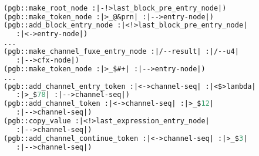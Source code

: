 \begin{lstlisting}[language = lisp, numbers = none, 
caption={Hypergraph Intermediate Representation},label={lst:figIR},
    basicstyle = \ttfamily\bfseries\tiny, linewidth = .95\linewidth] 

(pgb::make_root_node :|-!>last_block_pre_entry_node|)
(pgb::make_token_node :|>_@&prn| :|-->entry-node|)
(pgb::add_block_entry_node :|<!>last_block_pre_entry_node| 
   :|<->entry-node|)
...
(pgb::make_channel_fuxe_entry_node :|/--result| :|/--u4| 
   :|-->cfx-node|)
(pgb::make_token_node :|>_$#+| :|-->entry-node|)
...
(pgb::add_channel_entry_token :|<->channel-seq| :|<$>lambda| 
   :|>_$78| :|-->channel-seq|)
(pgb::add_channel_token :|<->channel-seq| :|>_$12| 
   :|-->channel-seq|)
(pgb::copy_value :|<!>last_expression_entry_node| 
   :|-->channel-seq|)
(pgb::add_channel_continue_token :|<->channel-seq| :|>_$3| 
   :|-->channel-seq|)

\end{lstlisting}
